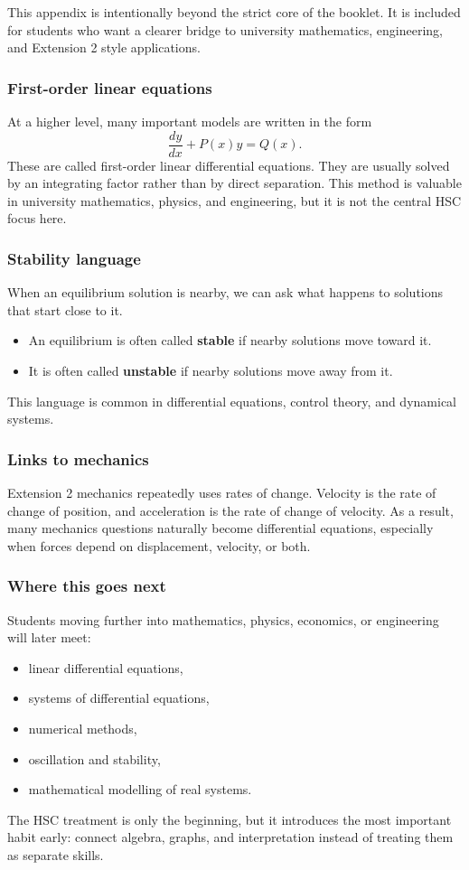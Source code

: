 This appendix is intentionally beyond the strict core of the booklet. It is included for students who want a clearer bridge to university mathematics, engineering, and Extension 2 style applications.

\subsubsection*{First-order linear equations}
At a higher level, many important models are written in the form
\[
\frac{dy}{dx} + P(x)y = Q(x).
\]
These are called first-order linear differential equations. They are usually solved by an integrating factor rather than by direct separation. This method is valuable in university mathematics, physics, and engineering, but it is not the central HSC focus here.

\subsubsection*{Stability language}
When an equilibrium solution is nearby, we can ask what happens to solutions that start close to it.

\begin{itemize}[leftmargin=*]
  \item An equilibrium is often called \textbf{stable} if nearby solutions move toward it.
  \item It is often called \textbf{unstable} if nearby solutions move away from it.
\end{itemize}

This language is common in differential equations, control theory, and dynamical systems.

\subsubsection*{Links to mechanics}
Extension 2 mechanics repeatedly uses rates of change. Velocity is the rate of change of position, and acceleration is the rate of change of velocity. As a result, many mechanics questions naturally become differential equations, especially when forces depend on displacement, velocity, or both.

\subsubsection*{Where this goes next}
Students moving further into mathematics, physics, economics, or engineering will later meet:
\begin{itemize}[leftmargin=*]
  \item linear differential equations,
  \item systems of differential equations,
  \item numerical methods,
  \item oscillation and stability,
  \item mathematical modelling of real systems.
\end{itemize}

The HSC treatment is only the beginning, but it introduces the most important habit early: connect algebra, graphs, and interpretation instead of treating them as separate skills.
